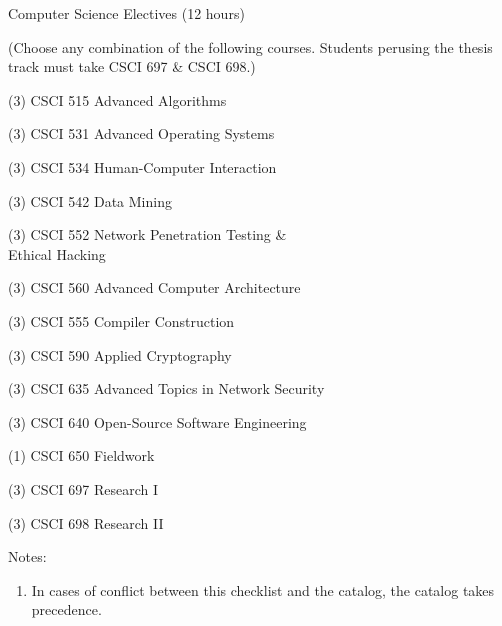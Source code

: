 \begin{reqgroup}{Computer Science Electives (12 hours)}
\begin{center}%
(Choose any combination of the following courses. Students perusing the thesis track must take CSCI 697 \& CSCI 698.)\vspace{-0.5em}%
\end{center}%
\begin{checklist}
\begin{minipage}[t]{0.5\linewidth}
	\item (3) CSCI 515  Advanced Algorithms
	\item (3) CSCI 531  Advanced Operating Systems
	\item (3) CSCI 534  Human-Computer Interaction
	\item (3) CSCI 542  Data Mining
	\item (3) CSCI 552  Network Penetration Testing \&\\Ethical Hacking
	\item (3) CSCI 560  Advanced Computer Architecture
	\item (3) CSCI 555  Compiler Construction %
\end{minipage}
\begin{minipage}[t]{0.5\linewidth}
	\item (3) CSCI 590  Applied Cryptography
	\item (3) CSCI 635  Advanced Topics in Network Security
	\item (3) CSCI 640  Open-Source Software Engineering %
	\item (1) CSCI 650  Fieldwork
	\item (3) CSCI 697  Research I
	\item (3) CSCI 698  Research II
\end{minipage}
\end{checklist}
\end{reqgroup}

Notes:%
\begin{enumerate}\footnotesize
	\item In cases of conflict between this checklist and the catalog, the catalog takes precedence.
\end{enumerate}